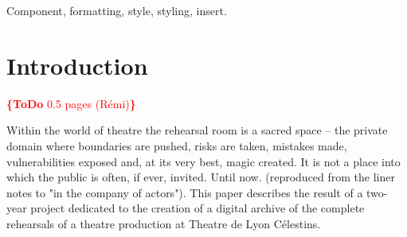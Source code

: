\documentclass[conference]{IEEEtran}
\newcommand{\todo}[1]{\noindent\textcolor{red}{{\bf \{ToDo} #1{\bf \}}}}
\begin{document}




\maketitle


\begin{abstract}
\todo{BLA BLA BLA}
\end{abstract}


\begin{keywords}
Component, formatting, style, styling, insert.
\end{keywords}

%
\IEEEpeerreviewmaketitle



\section{Introduction}

\todo{0.5 pages (Rémi)}

Within the world of theatre the rehearsal room is a sacred space -- the private domain where boundaries are pushed, risks are taken, mistakes made, vulnerabilities exposed and, at its very best, magic created. It is not a place into which the public is often, if ever, invited. Until now. (reproduced from the liner notes to "in the company of actors"). This paper describes the result of a two-year project dedicated to the creation of a digital archive  of  the complete  rehearsals of a theatre production at Theatre de Lyon Célestins.
\end{document}
